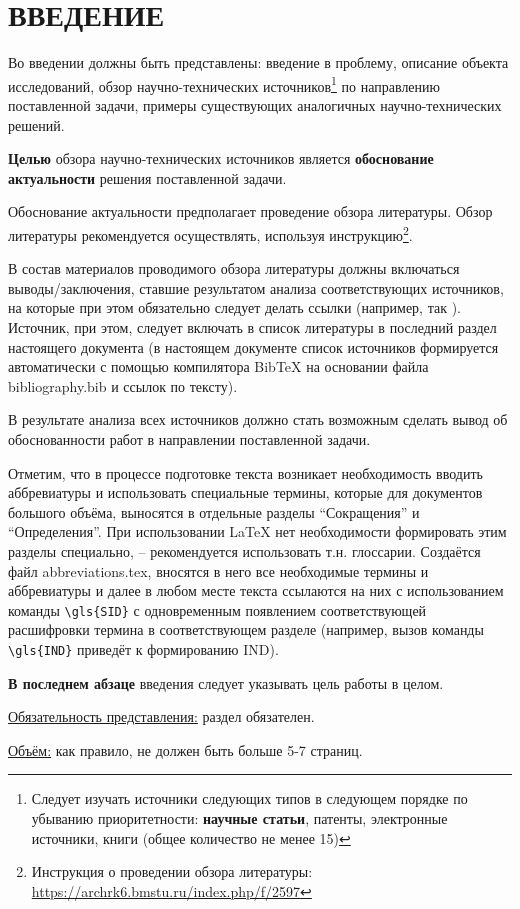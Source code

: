 \chapter*{ВВЕДЕНИЕ}\label{chap.introduction}


Во введении должны быть представлены: введение в проблему, описание объекта исследований, обзор научно-технических источников\footnote{Следует изучать источники следующих типов в следующем порядке по убыванию приоритетности: \textbf{научные статьи}, патенты, электронные источники, книги (общее количество не менее 15)} по направлению поставленной задачи, примеры существующих аналогичных научно-технических решений.

\textbf{Целью} обзора научно-технических источников является \textbf{обоснование актуальности} решения поставленной задачи.

Обоснование актуальности предполагает проведение обзора литературы. Обзор литературы рекомендуется осуществлять, используя инструкцию\footnote{Инструкция о проведении обзора литературы: \url{https://archrk6.bmstu.ru/index.php/f/2597}}.

В состав материалов проводимого обзора литературы должны включаться выводы/заключения, ставшие результатом анализа соответствующих источников, на которые при этом обязательно следует делать ссылки (например, так \cite{FloatingPointData2021}). Источник, при этом, следует включать в список литературы в последний раздел настоящего документа (в настоящем документе список источников формируется автоматически с помощью компилятора \textsf{BibTeX} на основании файла \textsf{bibliography.bib} и ссылок по тексту).

В результате анализа всех источников должно стать возможным сделать вывод об обоснованности работ в направлении поставленной задачи.

\begin{remark}
Отметим, что в процессе подготовке текста возникает необходимость вводить аббревиатуры и использовать специальные термины, которые для документов большого объёма, выносятся в отдельные разделы ``Сокращения'' и ``Определения''. При использовании \LaTeX\xspace нет необходимости формировать этим разделы специально, -- рекомендуется использовать т.н. глоссарии. Создаётся файл \textsf{abbreviations.tex}, вносятся в него все необходимые термины и аббревиатуры и далее в любом месте текста ссылаются на них с использованием команды {\verb_\gls{SID}_} с одновременным появлением соответствующей расшифровки термина в соответствующем разделе (например, вызов команды {\verb_\gls{IND}_} приведёт к формированию \gls{IND}).
\end{remark}


\textbf{В последнем абзаце} введения следует указывать цель работы в целом.

\underline{Обязательность представления:} раздел обязателен. 

\underline{Объём:} как правило, не должен быть больше 5-7 страниц.


